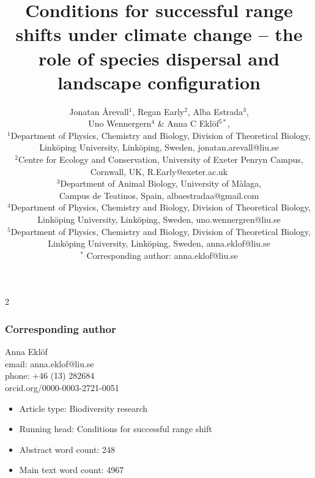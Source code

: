 \documentclass[12pt,pdftex]{article}
\date{}
\title{Conditions for successful range shifts under climate change -- the role of species dispersal and landscape configuration}
\author{Jonatan \r{A}revall$^{1}$,  Regan Early$^{2}$, Alba Estrada$^{3}$, \\ Uno Wennergern$^{4}$ \& Anna C Ekl\"{o}f$^{5*}$,\\
 $^1$\small Department of Physics, Chemistry and Biology, Division of Theoretical Biology,\\ \small  Link\"{o}ping University, Link\"{o}ping, Sweden, jonatan.arevall@liu.se\\
 $^2$\small Centre for Ecology and Conservation, University of Exeter Penryn Campus,\\ \small Cornwall, UK, R.Early@exeter.ac.uk\\
 $^3$\small Department of Animal Biology, University of M\`{a}laga,\\ \small Campus de Teatinos, Spain, albaestradaa@gmail.com \\
 $^4$\small Department of Physics, Chemistry and Biology, Division of Theoretical Biology,\\ \small  Link\"{o}ping University, Link\"{o}ping, Sweden, uno.wennergren@liu.se\\
 $^5$\small Department of Physics, Chemistry and Biology, Division of Theoretical Biology,\\ \small  Link\"{o}ping University, Link\"{o}ping, Sweden, anna.eklof@liu.se\\
  $^*$ \small Corresponding author: anna.eklof@liu.se\\
}
\begin{document}
\linenumbers
\maketitle
\baselineskip 18pt
\begin{spacing}{2}

\subsubsection*{Corresponding author}
Anna Ekl\"{o}f\\
email: anna.eklof@liu.se\\
phone: +46 (13) 282684\\
orcid.org/0000-0003-2721-0051\\


%

\clearpage

\begin{itemize}
\item Article type: Biodiversity research
\item Running head: Conditions for successful range shift
\item Abstract word count: 248
\item Main text word count: 4967 %
\end{itemize}


\end{spacing}
\end{document}
